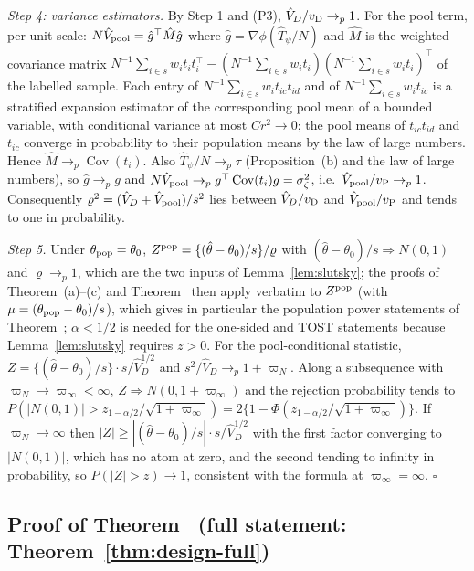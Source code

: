 \emph{Step 4: variance estimators.} By Step 1 and (P3), $\hat V_D/v_{\rm D}\to_p1$. For the pool term, per-unit scale: $N\hat V_{\rm pool}=\hat g^\top\hat M\hat g$ where $\hat g=\nabla\phi(\hat T_\psi/N)$ and $\hat M$ is the weighted covariance matrix $N^{-1}\sum_{i\in s}w_it_it_i^\top-(N^{-1}\sum_{i\in s}w_it_i)(N^{-1}\sum_{i\in s}w_it_i)^\top$ of the labelled sample. Each entry of $N^{-1}\sum_{i\in s}w_it_{ic}t_{id}$ and of $N^{-1}\sum_{i\in s}w_it_{ic}$ is a stratified expansion estimator of the corresponding pool mean of a bounded variable, with conditional variance at most $Cr^2\to0$; the pool means of $t_{ic}t_{id}$ and $t_{ic}$ converge in probability to their population means by the law of large numbers. Hence $\hat M\to_p\operatorname{Cov}(t_i)$. Also $\hat T_\psi/N\to_p\tau$ (Proposition~(b) and the law of large numbers), so $\hat g\to_pg$ and $N\hat V_{\rm pool}\to_pg^\top\operatorname{Cov}(t_i)g=\sigma^2_\zeta$, i.e.\ $\hat V_{\rm pool}/v_{\rm P}\to_p1$. Consequently $\varrho^2=(\hat V_D+\hat V_{\rm pool})/s^2$ lies between $\hat V_D/v_{\rm D}$ and $\hat V_{\rm pool}/v_{\rm P}$ and tends to one in probability.

\emph{Step 5.} Under $\theta_{\rm pop}=\theta_0$, $Z^{\rm pop}=\{(\hat\theta-\theta_0)/s\}/\varrho$ with $(\hat\theta-\theta_0)/s\Rightarrow N(0,1)$ and $\varrho\to_p1$, which are the two inputs of Lemma~\ref{lem:slutsky}; the proofs of Theorem~(a)--(c) and Theorem~ then apply verbatim to $Z^{\rm pop}$ (with $\mu=(\theta_{\rm pop}-\theta_0)/s$), which gives in particular the population power statements of Theorem~; $\alpha<1/2$ is needed for the one-sided and TOST statements because Lemma~\ref{lem:slutsky} requires $z>0$. For the pool-conditional statistic, $Z=\{(\hat\theta-\theta_0)/s\}\cdot s/\hat V_D^{1/2}$ and $s^2/\hat V_D\to_p1+\varpi_N$. Along a subsequence with $\varpi_N\to\varpi_\infty<\infty$, $Z\Rightarrow N(0,1+\varpi_\infty)$ and the rejection probability tends to $P(|N(0,1)|>z_{1-\alpha/2}/\sqrt{1+\varpi_\infty})=2\{1-\Phi(z_{1-\alpha/2}/\sqrt{1+\varpi_\infty})\}$. If $\varpi_N\to\infty$ then $|Z|\ge|(\hat\theta-\theta_0)/s|\cdot s/\hat V_D^{1/2}$ with the first factor converging to $|N(0,1)|$, which has no atom at zero, and the second tending to infinity in probability, so $P(|Z|>z)\to1$, consistent with the formula at $\varpi_\infty=\infty$. $\square$

\subsection{Proof of Theorem~ (full statement: Theorem~\ref{thm:design-full})}\label{si:testing-design}

